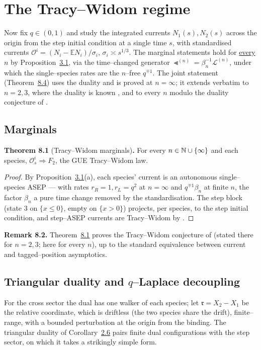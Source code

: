 \documentclass[11pt]{article}
\theoremstyle{plain}
\theoremstyle{definition}
\theoremstyle{remark}
\newcommand{\E}{\mathbb{E}}\newcommand{\PP}{\mathbb{P}}\newcommand{\dd}{\,\mathrm{d}}
\newcommand{\To}{\Rightarrow}\newcommand{\so}{\mathfrak{so}}
\newcommand{\cL}{\mathcal L}\newcommand{\cO}{\mathcal O}\newcommand{\cE}{\mathcal E}
\begin{document}
\section{The Tracy--Widom regime}\label{sec_tw}

Now fix $q\in(0,1)$ and study the integrated currents $N_1(s),N_2(s)$ across the origin
from the step initial condition at a single time $s$, with standardised currents
$\cO^i=(N_i-\E N_i)/\sigma_i$, $\sigma_i\asymp s^{1/3}$. The marginal statements hold
for \underline{every} $n$ by Proposition~\hyperref[prop_decouple]{3.1}, via the time--changed
generator $\Lt^{(n)}=\beta_n^{-1}\cL^{(n)}$, under which the single--species rates
are the $n$--free $q^{\mp1}$. The joint statement (Theorem~\hyperref[thm_cov]{8.4}) uses the
duality and is proved at $n=\infty$; it extends verbatim to $n=2,3$, where the
duality is known \cite{REU}, and to every $n$ modulo the duality conjecture of
\cite[Rmk.~4]{REU}.

\subsection{Marginals}
\label{thm_marg}\noindent\textbf{Theorem 8.1} (Tracy--Widom marginals)\textbf{.} 
For every $n\in\mathbb{N}\cup\{\infty\}$ and each species, $\cO^i_s\To F_2$, the GUE
Tracy--Widom law.
\par
\begin{proof}
By Proposition~\hyperref[prop_decouple]{3.1}(a), each species' current
is an autonomous single--species ASEP --- with rates $r_R=1,r_L=q^2$ at $n=\infty$ and
$q^{\mp1}\beta_n$ at finite $n$, the factor $\beta_n$ a pure time change removed by
the standardisation. The step block (state $3$ on $\{x\le0\}$, empty on $\{x>0\}$)
projects, per species, to the step initial condition, and step--ASEP currents are
Tracy--Widom by \cite[Thm.~1.4]{BCS}.
\end{proof}

\noindent\textbf{Remark 8.2.} 
Theorem~\hyperref[thm_marg]{8.1} proves the Tracy--Widom conjecture of \cite[\S3.1.1]{REU}
(stated there for $n=2,3$; here for every $n$), up to the standard equivalence
between current and tagged--position asymptotics.
\par

\subsection{Triangular duality and $q$--Laplace decoupling}
For the cross sector the dual has one walker of each species; let
$\mathfrak r=X_2-X_1$ be the relative coordinate, which is driftless (the two species
share the drift), finite--range, with a bounded perturbation at the origin from the
binding. The triangular duality of Corollary~\hyperref[cor_tri]{2.6} pairs finite dual
configurations with the step sector, on which it takes a strikingly simple form.
\end{document}
